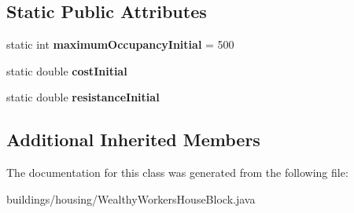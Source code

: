 \subsection*{Static Public Attributes}
\begin{DoxyCompactItemize}
\item 
static int {\bfseries maximum\+Occupancy\+Initial} = 500\hypertarget{classbuildings_1_1housing_1_1_wealthy_workers_house_block_ad710d39594f268ea53a6e9b1366b55b8}{}\label{classbuildings_1_1housing_1_1_wealthy_workers_house_block_ad710d39594f268ea53a6e9b1366b55b8}

\item 
static double {\bfseries cost\+Initial}\hypertarget{classbuildings_1_1housing_1_1_wealthy_workers_house_block_ac90b9901c9974822c2958a71832c8e20}{}\label{classbuildings_1_1housing_1_1_wealthy_workers_house_block_ac90b9901c9974822c2958a71832c8e20}

\item 
static double {\bfseries resistance\+Initial}\hypertarget{classbuildings_1_1housing_1_1_wealthy_workers_house_block_ad09dae20bb349766baacc9a700eebeec}{}\label{classbuildings_1_1housing_1_1_wealthy_workers_house_block_ad09dae20bb349766baacc9a700eebeec}

\end{DoxyCompactItemize}
\subsection*{Additional Inherited Members}


The documentation for this class was generated from the following file\+:\begin{DoxyCompactItemize}
\item 
buildings/housing/Wealthy\+Workers\+House\+Block.\+java\end{DoxyCompactItemize}
